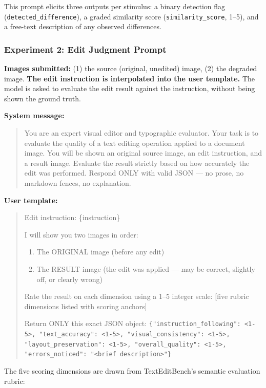 This prompt elicits three outputs per stimulus: a binary detection flag (\texttt{detected\_difference}), a graded similarity score (\texttt{similarity\_score}, 1--5), and a free-text description of any observed differences.

\subsubsection{Experiment 2: Edit Judgment Prompt}

\textbf{Images submitted:} (1) the source (original, unedited) image, (2) the degraded image.
\textbf{The edit instruction is interpolated into the user template.} The model is asked to evaluate the edit result against the instruction, without being shown the ground truth.

\textbf{System message:}
\begin{quote}
You are an expert visual editor and typographic evaluator. Your task is to evaluate the quality of a text editing operation applied to a document image. You will be shown an original source image, an edit instruction, and a result image. Evaluate the result strictly based on how accurately the edit was performed. Respond ONLY with valid JSON --- no prose, no markdown fences, no explanation.
\end{quote}

\textbf{User template:}
\begin{quote}
Edit instruction: \{instruction\}

I will show you two images in order:
\begin{enumerate}
\item The ORIGINAL image (before any edit)
\item The RESULT image (the edit was applied --- may be correct, slightly off, or clearly wrong)
\end{enumerate}
Rate the result on each dimension using a 1--5 integer scale: [five rubric dimensions listed with scoring anchors]

Return ONLY this exact JSON object:
\verb|{"instruction_following": <1-5>, "text_accuracy": <1-5>, "visual_consistency": <1-5>, "layout_preservation": <1-5>, "overall_quality": <1-5>, "errors_noticed": "<brief description>"}|
\end{quote}

The five scoring dimensions are drawn from TextEditBench's semantic evaluation rubric:

